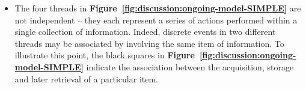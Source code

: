\begin{itemize}
\item The four threads in \textbf{Figure~\ref{fig:discussion:ongoing-model-SIMPLE}} are not independent -- they each represent a series of actions performed within a single collection of information.  Indeed, discrete events in two different threads may be associated by involving the same item of information.  To illustrate this point, the black squares in \textbf{Figure~\ref{fig:discussion:ongoing-model-SIMPLE}} indicate the association between the acquisition, storage and later retrieval of a particular item.  


\end{itemize}
